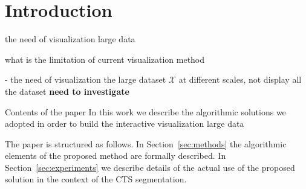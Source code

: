 \section{Introduction}
\label{sec:introduction}

the need of visualization large data

what is the limitation of current visualization method

- the need of visualization the large dataset $\mathcal{X}$ at different scales, not display all the dataset \textbf{need to investigate}

Contents of the paper
In this work we describe the algorithmic solutions we adopted in order
to build the interactive visualization large data


The paper is structured as follows. In Section~\ref{sec:methods} the
algorithmic elements of the proposed method are formally described. In
Section~\ref{sec:experiments} we describe details of the actual use of the proposed solution in the
context of the CTS segmentation. 

